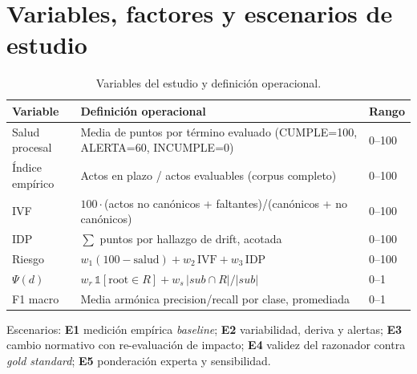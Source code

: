 \documentclass[a4paper,openany,12pt]{book}
\begin{document}
\section{Variables, factores y escenarios de estudio}
\begin{table}[H]\centering\footnotesize
\caption{Variables del estudio y definición operacional.}\label{tab:vars}
\begin{tabular}{p{2.6cm}p{8.6cm}p{1.6cm}}\toprule
\textbf{Variable} & \textbf{Definición operacional} & \textbf{Rango} \\ \midrule
Salud procesal & Media de puntos por término evaluado (CUMPLE=100, ALERTA=60, INCUMPLE=0) & 0--100 \\
Índice empírico & Actos en plazo / actos evaluables (corpus completo) & 0--100 \\
IVF & $100\cdot$(actos no canónicos + faltantes)/(canónicos + no canónicos) & 0--100 \\
IDP & $\sum$ puntos por hallazgo de drift, acotada & 0--100 \\
Riesgo & $w_1(100-\text{salud}) + w_2\,\text{IVF} + w_3\,\text{IDP}$ & 0--100 \\
$\Psi(d)$ & $w_r\,\mathbb{1}[\text{root}\in R] + w_s\,|sub\cap R|/|sub|$ & 0--1 \\
F1 macro & Media armónica precision/recall por clase, promediada & 0--1 \\ \bottomrule
\end{tabular}\end{table}
Escenarios: \textbf{E1} medición empírica \textit{baseline}; \textbf{E2} variabilidad, deriva y alertas; \textbf{E3} cambio normativo con re-evaluación de impacto; \textbf{E4} validez del razonador contra \textit{gold standard}; \textbf{E5} ponderación experta y sensibilidad.
\end{document}
